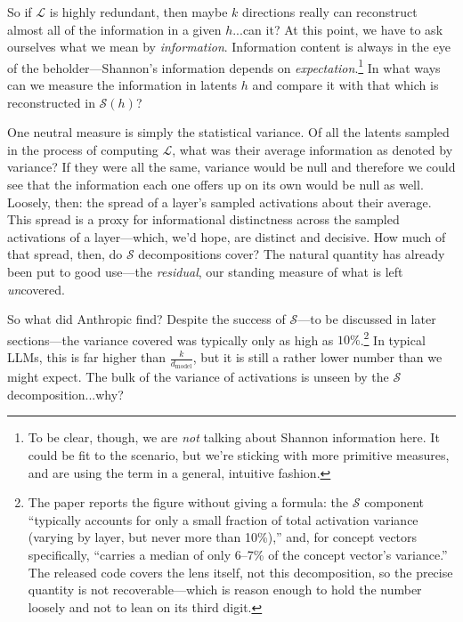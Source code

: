 \documentclass{article}
\newcommand{\jlens}{\mathscr{L}}
\newcommand{\jspace}{\mathscr{S}}
\newcommand{\dmodel}{d_{\text{model}}}
\begin{document}
So if \(\jlens\) is highly redundant, then maybe \(k\) directions really can reconstruct almost all of the information in a given \(h\)...can it? At this point, we have to ask ourselves what we mean by \textit{information}. Information content is always in the eye of the beholder---Shannon's information depends on \textit{expectation}.\footnote{To be clear, though, we are \textit{not} talking about Shannon information here. It could be fit to the scenario, but we're sticking with more primitive measures, and are using the term in a general, intuitive fashion.} In what ways can we measure the information in latents \(h\) and compare it with that which is reconstructed in \(\jspace(h)\)? 

One neutral measure is simply the statistical variance. Of all the latents sampled in the process of computing \(\jlens\), what was their average information as denoted by variance? If they were all the same, variance would be null and therefore we could see that the information each one offers up on its own would be null as well. Loosely, then: the spread of a layer's sampled activations about their average. This spread is a proxy for informational distinctness across the sampled activations of a layer---which, we'd hope, are distinct and decisive. How much of that spread, then, do \(\jspace\) decompositions cover? The natural quantity has already been put to good use---the \textit{residual}, our standing measure of what is left \textit{un}covered.

So what did Anthropic find? Despite the success of \(\jspace\)---to be discussed in later sections---the variance covered was typically only as high as \(10\%\).\footnote{The paper reports the figure without giving a formula: the \(\jspace\) component ``typically accounts for only a small fraction of total activation variance (varying by layer, but never more than 10\%),'' and, for concept vectors specifically, ``carries a median of only 6--7\% of the concept vector's variance.'' The released code covers the lens itself, not this decomposition, so the precise quantity is not recoverable---which is reason enough to hold the number loosely and not to lean on its third digit.} In typical LLMs, this is far higher than \(\frac{k}{\dmodel}\), but it is still a rather lower number than we might expect. The bulk of the variance of activations is unseen by the \(\jspace\) decomposition...why?
\end{document}
